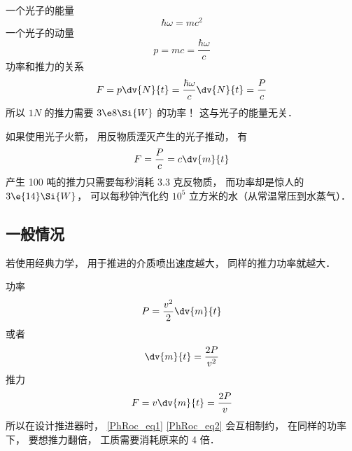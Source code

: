 
\begin{issues}
\issueDraft
\end{issues}

一个光子的能量
\begin{equation}
\hbar\omega = mc^2
\end{equation}
一个光子的动量
\begin{equation}
p = mc = \frac{\hbar\omega}{c}
\end{equation}
功率和推力的关系
\begin{equation}
F = p \dv{N}{t} = \frac{\hbar\omega}{c}\dv{N}{t} = \frac{P}{c}
\end{equation}
所以 $1N$ 的推力需要 $3\e8\Si{W}$ 的功率！ 这与光子的能量无关．

如果使用光子火箭， 用反物质湮灭产生的光子推动， 有
\begin{equation}
F = \frac{P}{c} = c\dv{m}{t}
\end{equation}
产生 100 吨的推力只需要每秒消耗 3.3 克反物质， 而功率却是惊人的 $3\e{14}\Si{W}$， 可以每秒钟汽化约 $10^5$ 立方米的水（从常温常压到水蒸气）．

\subsection{一般情况}
若使用经典力学， 用于推进的介质喷出速度越大， 同样的推力功率就越大．

功率
\begin{equation}
P = \frac{v^2}{2}\dv{m}{t}
\end{equation}
或者
\begin{equation}\label{PhRoc_eq1}
\dv{m}{t} = \frac{2P}{v^2}
\end{equation}
推力
\begin{equation}\label{PhRoc_eq2}
F = v\dv{m}{t} = \frac{2P}{v}
\end{equation}
所以在设计推进器时， \autoref{PhRoc_eq1} \autoref{PhRoc_eq2} 会互相制约， 在同样的功率下， 要想推力翻倍， 工质需要消耗原来的 4 倍．

